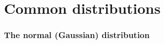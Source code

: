 \documentclass[10pt]{beamer}
\begin{document}

\section{Common distributions}

\begin{frame}
\frametitle{The normal (Gaussian) distribution}
\end{frame}








\end{document}
